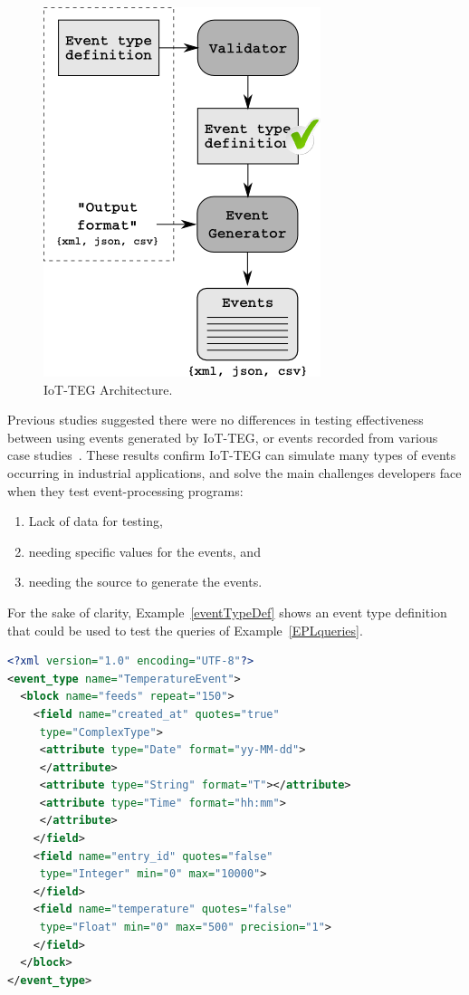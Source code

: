 \documentclass[conference]{IEEEtran}
\theoremstyle{definition}
\begin{document}
\begin{figure}[!h]
  \centering
  \includegraphics[scale=0.65]{./img/IoT-EGArquitecture}
  \caption[IoT-TEG Architecture]{IoT-TEG Architecture.}
  \label{fig:IoT-EGArquitecture}
\end{figure}

Previous studies suggested there were no differences in testing effectiveness between using events
generated by IoT-TEG, or events recorded from various case studies~\cite{Gutierrez2017}. These
results confirm IoT-TEG can simulate many types of events occurring in industrial applications,
and solve the main challenges developers face when they test event-processing programs:
\begin{enumerate}
 \item Lack of data for testing,
 \item needing specific values for the events, and
 \item needing the source to generate the events.
\end{enumerate}

For the sake of clarity, Example~\ref{eventTypeDef} shows an event type
definition that could be used to test the queries of Example~\ref{EPLqueries}.

\begin{lstlisting}[basicstyle=\ttfamily\footnotesize,language=XML,caption=Event type definition example,label=eventTypeDef]
<?xml version="1.0" encoding="UTF-8"?>
<event_type name="TemperatureEvent">
  <block name="feeds" repeat="150">
    <field name="created_at" quotes="true" 
     type="ComplexType">
     <attribute type="Date" format="yy-MM-dd">
     </attribute>
     <attribute type="String" format="T"></attribute>
     <attribute type="Time" format="hh:mm">
     </attribute>
    </field>
    <field name="entry_id" quotes="false" 
     type="Integer" min="0" max="10000">
    </field>
    <field name="temperature" quotes="false" 
     type="Float" min="0" max="500" precision="1">
    </field>
  </block>
</event_type>
\end{lstlisting}
\end{document}
